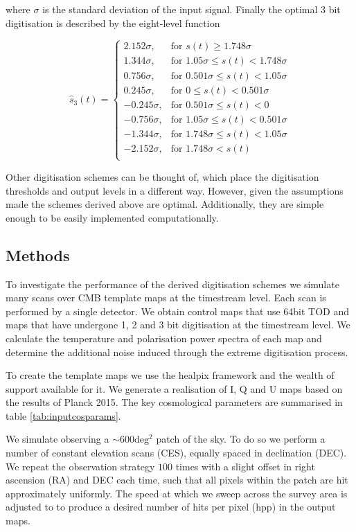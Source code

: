 \documentclass[apj]{emulateapj}
\begin{document}
where $\sigma$ is the standard deviation of the input signal. Finally the optimal 3 bit digitisation is described by the eight-level function

\[ \hat{s}_3(t) = \left\{ \begin{array}{rl}
2.152 \sigma, & \text{for } s(t) \geq 1.748 \sigma\\
1.344 \sigma, & \text{for } 1.05 \sigma \leq s(t) < 1.748 \sigma\\
0.756 \sigma, & \text{for } 0.501 \sigma \leq s(t) < 1.05 \sigma\\
0.245 \sigma, & \text{for } 0 \leq s(t) < 0.501 \sigma\\
-0.245 \sigma, & \text{for } 0.501 \sigma \leq s(t) < 0\\
-0.756 \sigma, & \text{for } 1.05 \sigma \leq s(t) < 0.501 \sigma\\
-1.344 \sigma, & \text{for } 1.748 \sigma \leq s(t) < 1.05 \sigma\\
-2.152 \sigma, & \text{for } 1.748 \sigma < s(t)\\
\end{array} \right. \]

Other digitisation schemes can be thought of, which place the digitisation thresholds and output levels in a different way. However, given the assumptions made the schemes derived above are optimal. Additionally, they are simple enough to be easily implemented computationally.

\subsection{Methods}
\label{subsec:method}

To investigate the performance of the derived digitisation schemes we simulate many scans over CMB template maps at the timestream level. Each scan is performed by a single detector. We obtain control maps that use 64bit TOD and maps that have undergone 1, 2 and 3 bit digitisation at the timestream level. We calculate the temperature and polarisation power spectra of each map and determine the additional noise induced through the extreme digitisation process.

To create the template maps we use the healpix framework and the wealth of support available for it. We generate a realisation of I, Q and U maps based on the results of Planck 2015. The key cosmological parameters are summarised in table \ref{tab:inputcosparams}.

We simulate observing a $\sim 600 \mathrm{deg^2}$ patch of the sky. To do so we perform a number of constant elevation scans (CES), equally spaced in declination (DEC). We repeat the observation strategy $100$ times with a slight offset in right ascension (RA) and DEC each time, such that all pixels within the patch are hit approximately uniformly. The speed at which we sweep across the survey area is adjusted to to produce a desired number of hits per pixel (hpp) in the output maps.
\end{document}
